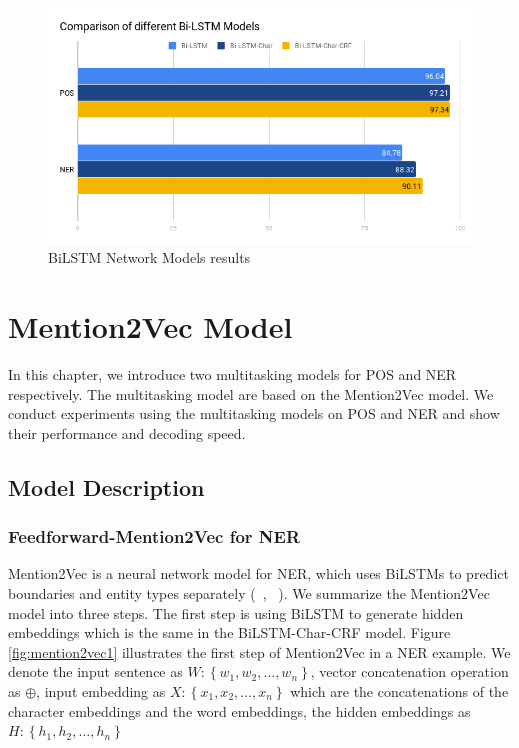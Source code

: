 \documentclass{sfuthesis}
\begin{document}
\begin{figure}
  \centering
  \includegraphics[scale=0.6]{lstm.png}
 \caption{BiLSTM Network Models results}
  \label{fig:lstm}
\end{figure}


\chapter{Mention2Vec Model}

In this chapter, we introduce two multitasking models for POS and NER respectively. The multitasking model are based on the Mention2Vec model. We conduct experiments using the multitasking models on POS and NER and show their performance and decoding speed. 

\section{Model Description}

\subsection{Feedforward-Mention2Vec for NER}

Mention2Vec is a neural network model for NER, which uses BiLSTMs to predict boundaries and entity types separately (~\citeauthor{stratos2016mention2vec}, ~\citeyear{stratos2016mention2vec}). We summarize the Mention2Vec model into three steps. The first step is using BiLSTM to generate hidden embeddings which is the same in the BiLSTM-Char-CRF model. Figure \ref{fig:mention2vec1} illustrates the first step of Mention2Vec in a NER example. We denote the input sentence as $W: \left\{w_{1}, w_{2}, \dots, w_{n}\right\}$, vector concatenation operation as $\oplus$, input embedding as $X: \left\{x_{1}, x_{2}, \dots, x_{n}\right\}$ which are the concatenations of the character embeddings and the word embeddings, the hidden embeddings as $H: \left\{h_{1}, h_{2}, \dots, h_{n}\right\}$
\end{document}
